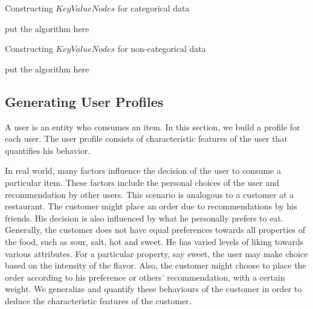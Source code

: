 \documentclass{acm_proc_article-sp}
\begin{document}
\begin{algorithm}
\label{keyValueNodesCategorical_algo}
\caption{Constructing $KeyValueNodes$ for categorical data}
\begin{algorithmic}[1]
    \STATE put the algorithm here
\end{algorithmic}
\end{algorithm}

\begin{algorithm}
\label{keyValueNodesNonCategorical_algo}
\caption{Constructing $KeyValueNodes$ for non-categorical data}
\begin{algorithmic}[1]
    \STATE put the algorithm here
\end{algorithmic}
\end{algorithm}

\subsection{Generating User Profiles}
\label{sec:userProf}

A user is an entity who consumes an item. In this section, we build a profile for each user. The user profile consists of characteristic features of the user that quantifies his behavior.

In real world, many factors influence the decision of the user to consume a particular item. These factors include the personal choices of the user and recommendation by other users. This scenario is analogous to a customer at a restaurant. The customer might place an order due to recommendations by his friends. His decision is also influenced by what he personally prefers to eat. Generally, the customer does not have equal preferences towards all properties of the food, such as sour, salt, hot and sweet. He has varied levels of liking towards various attributes. For a particular property, say sweet, the user may make choice based on the intensity of the flavor. Also, the customer might choose to place the order according to his preference or others' recommendation, with a certain weight. We generalize and quantify these behaviours of the customer in order to deduce the characteristic features of the customer.
\end{document}
